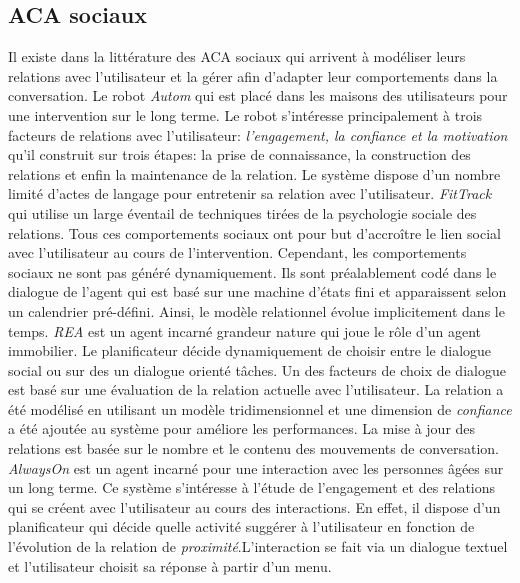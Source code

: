 \documentclass [french]{sig-alternate-05-2015}
\begin{document}
\subsection{ACA sociaux}

\par Il existe dans la littérature des  ACA sociaux  qui arrivent à modéliser leurs relations avec l'utilisateur et la gérer afin d'adapter leur comportements dans la conversation. Le robot \textit{Autom} \cite{kidd2005sociable} qui est placé dans les maisons des utilisateurs pour une intervention sur le long terme. Le robot s'intéresse principalement à trois facteurs de relations avec l'utilisateur: \textit{l'engagement, la confiance et la motivation} qu'il construit sur trois étapes: la prise de connaissance, la construction des relations et enfin la maintenance de la relation. Le système dispose d'un nombre limité d'actes de langage pour  entretenir sa relation avec l'utilisateur. \textit{FitTrack} \cite{bickmore2005s} qui utilise un large éventail de techniques tirées de la psychologie sociale des relations. Tous ces comportements sociaux ont pour but d’accroître le lien social avec l'utilisateur au cours de l'intervention.
 Cependant, les comportements sociaux ne sont pas généré dynamiquement. Ils sont préalablement codé dans le dialogue de l'agent qui est basé sur une machine d'états fini et apparaissent selon un calendrier pré-défini. Ainsi, le modèle relationnel évolue implicitement dans le temps. \textit{REA} \cite{bickmore2005establishing} est un agent incarné grandeur nature qui joue le rôle d'un agent immobilier. Le planificateur décide dynamiquement de choisir entre le dialogue social ou sur des un dialogue orienté tâches. Un des facteurs de choix de dialogue est basé sur une évaluation de la relation actuelle avec l'utilisateur. La relation a été modélisé en utilisant un modèle tridimensionnel \cite{svennevig2000getting} et une dimension de \textit{confiance} a été ajoutée au système pour améliore les performances. La mise à jour des relations est basée sur le nombre et le contenu des mouvements de conversation.
\textit{AlwaysOn} \cite{sidner2013always} est un agent incarné pour une interaction avec les personnes âgées sur un long terme. Ce système s'intéresse à l'étude de l'engagement et des relations qui se créent avec l'utilisateur au cours des interactions. En effet, il dispose d'un planificateur qui décide quelle activité suggérer à l'utilisateur en fonction de l'évolution de la relation de \textit{proximité}.L'interaction se fait via un dialogue textuel et l'utilisateur choisit sa réponse à partir d'un menu.
\end{document}
